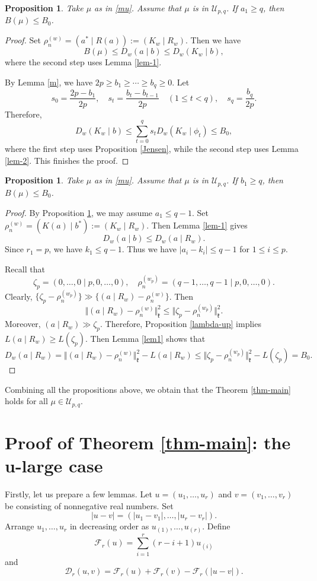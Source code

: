 \documentclass[11pt]{amsart}
\theoremstyle{plain}
\newtheorem{prop}[thm]{Proposition}
\theoremstyle{definition}
\newcommand{\frk}{\mathfrak{k}}
\newcommand{\caD}{\mathcal{D}}
\newcommand{\caF}{\mathcal{F}}
\newcommand{\caU}{\mathcal{U}}
\begin{document}
\begin{prop}\label{a_1>q}
Take $\mu$ as in \eqref{mu}.	Assume that	 $\mu$ is in $\caU_{p,q}$. If $a_1\ge q$, then $B(\mu)\le B_0$.
\end{prop}
\begin{proof}
	Set $\rho_n^{(w)}=(a^*\mid R(a)):=(K_w\mid R_w)$. Then we have
	\[B(\mu)\le D_w(a\mid b)\le D_w(K_w\mid b),\]
where the second step uses Lemma \ref{lem-1}.
	
	By Lemma \ref{m}, we have $2p\ge b_1\ge\cdots\ge b_q\ge 0$. Let
\[s_0=\dfrac{2p-b_1}{2p},\quad s_t=\dfrac{b_t-b_{t-1}}{2p}\quad (1\le t<q),\quad s_q=\dfrac{b_q}{2p}.\]
Therefore,	
	\[D_w(K_w\mid b)\le\sum_{t=0}^qs_tD_w(K_w\mid \phi_t)\le B_0,\]
where  the first step uses Proposition \ref{Jensen}, while the second step uses Lemma \ref{lem-2}.  This finishes the proof.
\end{proof}
\begin{prop}
	Take $\mu$ as in \eqref{mu}.	Assume that	 $\mu$ is in $\caU_{p,q}$. If $b_1\ge q$, then $B(\mu)\le B_0$.
\end{prop}
\begin{proof}
	By Proposition \ref{a_1>q}, we may assume $a_1\le q-1$. Set $\rho_n^{(w)}=(K(a)\mid b^*):=(K_w\mid R_w)$. Then Lemma \ref{lem-1} gives
	\[D_w(a\mid b)\le D_w(a\mid R_w).\]
	Since $r_1=p$, we have $k_1\le q-1$. Thus we have $|a_i-k_i|\le q-1$ for $1\le i\le p$.
	
	Recall that
		\[\zeta_p=(0,\dots,0\mid p,0,\dots,0),\quad \rho_n^{(w_p)}=(q-1,\dots,q-1\mid p,0,\dots,0).\]
	Clearly, $\{\zeta_p-\rho_n^{(w_p)}\}\gg\{(a\mid R_w)-\rho_n^{(w)}\}$. Then
	\[\Vert(a\mid R_w)-\rho_n^{(w)}\Vert_\frk^2\le \Vert \zeta_p-\rho_n^{(w_p)}\Vert_\frk^2.\]
	Moreover, $(a\mid R_w)\gg\zeta_p$. Therefore, Proposition \ref{lambda-up} implies $L(a\mid R_w)\ge L(\zeta_p)$. Then Lemma \ref{lem1} shows that
	\[D_w(a\mid R_w)=\Vert(a\mid R_w)-\rho_n^{(w)}\Vert_\frk^2-L(a\mid R_w)\le \Vert\zeta_p-\rho_n^{(w_p)}\Vert_\frk^2-L(\zeta_p)=B_0.\]
\end{proof}

Combining all the propositions above, we obtain that the Theorem \ref{thm-main} holds for all $\mu\in\caU_{p, q}$.

\section{Proof of Theorem \ref{thm-main}: the u-large case}\label{sec-u-large}
Firstly, let us prepare a few lemmas.
Let $u=(u_1,\dots,u_r)$ and $v=(v_1,\dots,v_r)$ be consisting of  nonnegative real numbers. Set
\[|u-v|=(|u_1-v_1|,\dots,|u_r-v_r|).\]
Arrange $u_1,\dots,u_r$ in decreasing order as $u_{(1)},\dots,u_{(r)}$. Define
\[\caF_r(u)=\sum_{i=1}^r(r-i+1)u_{(i)}\]
and
\[\caD_r(u,v)=\caF_r(u)+\caF_r(v)-\caF_r(|u-v|).\]
\end{document}
